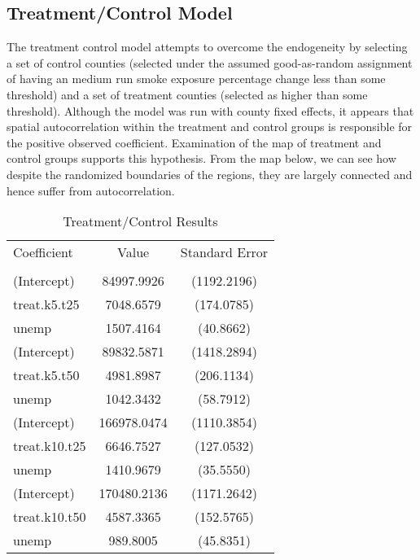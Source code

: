 \documentclass[12pt]{article}
\begin{document}
\subsection{Treatment/Control Model} The treatment control model attempts to overcome the endogeneity by selecting a set of control counties (selected under the assumed good-as-random assignment of having an medium run smoke exposure percentage change less than some threshold) and a set of treatment counties (selected as higher than some threshold).  Although the model was run with county fixed effects, it appears that spatial autocorrelation within the treatment and control groups is responsible for the positive observed coefficient.  Examination of the map of treatment and control groups supports this hypothesis. From the map below, we can see how despite the randomized boundaries of the regions, they are largely connected and hence suffer from autocorrelation.

\begin{table}[!htbp] \centering 
  \caption{Treatment/Control Results} 
  \label{} 
\begin{tabular}{@{\extracolsep{5pt}}lcc}\\[-1.8ex] \\ \hline
Coefficient & Value & Standard Error \\  
\hline \\[-1.8ex]
(Intercept)    & 84997.9926   & (1192.2196) \\
treat.k5.t25  &   7048.6579   & (174.0785) \\
unemp        &   1507.4164    &  (40.8662) \\
(Intercept)   & 89832.5871  & (1418.2894) \\
treat.k5.t50 &  4981.8987  &  (206.1134) \\
unemp       &   1042.3432    &   (58.7912) \\
(Intercept)  &  166978.0474 & (1110.3854) \\
treat.k10.t25  &  6646.7527 &  (127.0532) \\
unemp         &   1410.9679  &  (35.5550) \\
(Intercept)  &  170480.2136 &   (1171.2642) \\
treat.k10.t50  &  4587.3365  &  (152.5765) \\
unemp         &    989.8005     &  (45.8351)  \\
\hline
\end{tabular}
\end{table}
\end{document}
